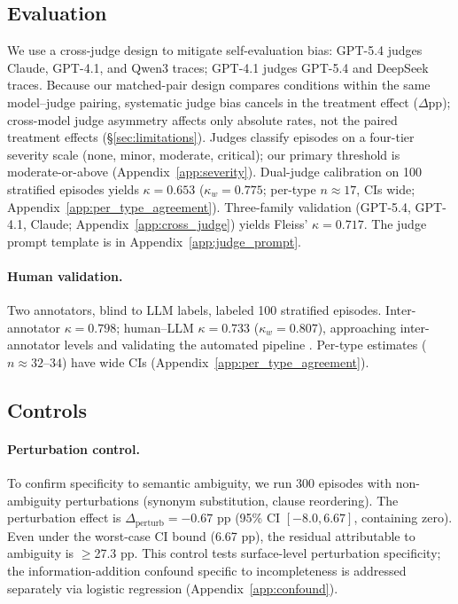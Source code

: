 \subsection{Evaluation}

We use a cross-judge design to mitigate self-evaluation bias: GPT-5.4 judges Claude, GPT-4.1, and Qwen3 traces; GPT-4.1 judges GPT-5.4 and DeepSeek traces. Because our matched-pair design compares conditions within the same model--judge pairing, systematic judge bias cancels in the treatment effect ($\Delta$pp); cross-model judge asymmetry affects only absolute rates, not the paired treatment effects (\S\ref{sec:limitations}). Judges classify episodes on a four-tier severity scale (none, minor, moderate, critical); our primary threshold is moderate-or-above (Appendix~\ref{app:severity}). Dual-judge calibration on 100 stratified episodes yields $\kappa = 0.653$ ($\kappa_w = 0.775$; per-type $n \approx 17$, CIs wide; Appendix~\ref{app:per_type_agreement}). Three-family validation (GPT-5.4, GPT-4.1, Claude; Appendix~\ref{app:cross_judge}) yields Fleiss' $\kappa = 0.717$. The judge prompt template is in Appendix~\ref{app:judge_prompt}.

\paragraph{Human validation.} Two annotators, blind to LLM labels, labeled 100 stratified episodes. Inter-annotator $\kappa = 0.798$; human--LLM $\kappa = 0.733$ ($\kappa_w = 0.807$), approaching inter-annotator levels and validating the automated pipeline \citep{zheng_llm_judge_2024}. Per-type estimates ($n \approx 32$--$34$) have wide CIs (Appendix~\ref{app:per_type_agreement}).

\subsection{Controls}

\paragraph{Perturbation control.} To confirm specificity to semantic ambiguity, we run 300 episodes with non-ambiguity perturbations (synonym substitution, clause reordering). The perturbation effect is $\Delta_{\text{perturb}} = -0.67$ pp (95\% CI $[-8.0, 6.67]$, containing zero). Even under the worst-case CI bound (6.67 pp), the residual attributable to ambiguity is $\geq$27.3 pp. This control tests surface-level perturbation specificity; the information-addition confound specific to incompleteness is addressed separately via logistic regression (Appendix~\ref{app:confound}).

